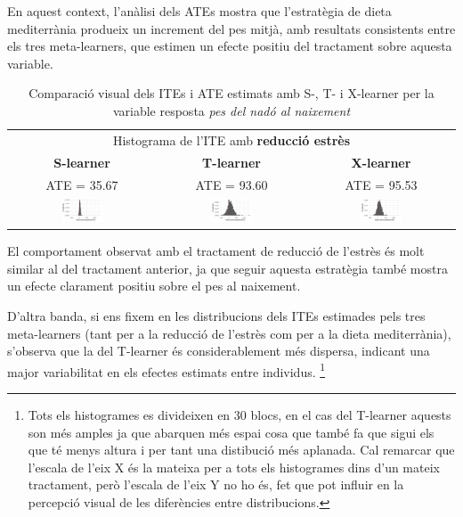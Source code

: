 \documentclass[../main.tex]{subfiles}
\begin{document}
    En aquest context, l’anàlisi dels ATEs mostra que l’estratègia de dieta mediterrània produeix un increment del pes mitjà, amb resultats consistents entre els tres meta-learners, que estimen un efecte positiu del tractament sobre aquesta variable.


    \begin{table}[H]
    \centering
    \begin{tabular}{ccc}
    \multicolumn{3}{c}{Histograma de l'ITE amb \textbf{reducció estrès}} \\
    \small \textbf{S-learner} & \small \textbf{T-learner} & \small\textbf{X-learner} \\
    \footnotesize ATE = 35.67 & \footnotesize ATE = 93.60 & \footnotesize ATE = 95.53 \\
    \includegraphics[width=0.3\textwidth]{imgs/histogrames/hist(PesoRN)S_tract3.jpg} &
    \includegraphics[width=0.3\textwidth]{imgs/histogrames/hist(PesoRN)T_tract3.jpg} &
    \includegraphics[width=0.3\textwidth]{imgs/histogrames/hist(PesoRN)X_tract3.jpg} \\
    \end{tabular}
    \caption{\footnotesize Comparació visual dels ITEs i ATE estimats amb S-, T- i X-learner per la variable resposta \textit{pes del nadó al naixement}}
    \label{tab:histITE_pes3}
    \end{table}

    El comportament observat amb el tractament de reducció de l'estrès és molt similar al del tractament anterior, ja que seguir aquesta estratègia també mostra un efecte clarament positiu sobre el pes al naixement.\par
    D’altra banda, si ens fixem en les distribucions dels ITEs estimades pels tres meta-learners (tant per a la reducció de l’estrès com per a la dieta mediterrània), s’observa que la del T-learner és considerablement més dispersa, indicant una major variabilitat en els efectes estimats entre individus. \footnote{Tots els histogrames es divideixen en 30 blocs, en el cas del T-learner aquests son més amples ja que abarquen més espai cosa que també fa que sigui els que té menys altura i per tant una distibució més aplanada. Cal remarcar que l’escala de l’eix X és la mateixa per a tots els histogrames dins d’un mateix tractament, però l’escala de l’eix Y no ho és, fet que pot influir en la percepció visual de les diferències entre distribucions.}
\end{document}
